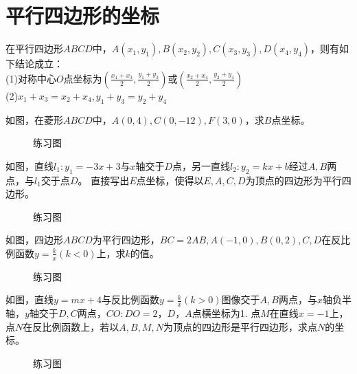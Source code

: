 \section{平行四边形的坐标}
\begin{theorem}
    在平行四边形$ABCD$中，$A(x_1,y_1),B(x_2,y_2),C(x_3,y_3),D(x_4,y_4)$，则有如下结论成立： \\
    (1)对称中心$O$点坐标为$(\frac{x_1+x_3}{2},\frac{y_1+y_3}{2})$或$(\frac{x_2+x_4}{2},\frac{y_2+y_4}{2})$ \\
    (2)$x_1+x_3=x_2+x_4,y_1+y_3=y_2+y_4$ \\
\end{theorem}
\begin{problem}
如图，在菱形$ABCD$中，$A(0,4),C(0,-12),F(3,0)$，求$B$点坐标。
\end{problem}
\begin{figure}[H]
    \centering
    \resizebox{4cm}{!}{}
    \caption{练习图}
\end{figure}
\begin{problem}
如图，直线$l_1:y_1=-3x+3$与$x$轴交于$D$点，另一直线$l_2:y_2=kx+b$经过$A,B$两点，与$l_1$交于点$D$。
直接写出$E$点坐标，使得以$E,A,C,D$为顶点的四边形为平行四边形。
\end{problem}
\begin{figure}[H]
    \centering
    \resizebox{4cm}{!}{}
    \caption{练习图}
\end{figure}
\begin{problem}
如图，四边形$ABCD$为平行四边形，$BC=2AB,A(-1,0),B(0,2),C,D$在反比例函数$y=\frac{k}{x}(k<0)$上，求$k$的值。
\end{problem}
\begin{figure}[H]
    \centering
    \resizebox{4cm}{!}{}
    \caption{练习图}
\end{figure}
\begin{problem}
如图，直线$y=mx+4$与反比例函数$y=\frac{k}{x}(k>0)$图像交于$A,B$两点，与$x$轴负半轴，$y$轴交于$D,C$两点，$CO:DO=2$，$D$，$A$点横坐标为1.
点$M$在直线$x=-1$上，点$N$在反比例函数上，若以$A,B,M,N$为顶点的四边形是平行四边形，求点$N$的坐标。
\end{problem}
\begin{figure}[H]
    \centering
    \resizebox{4cm}{!}{}
    \caption{练习图}
\end{figure}
\clearpage

